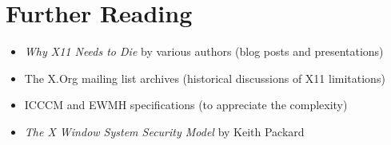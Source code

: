 \section{Further Reading}

\begin{itemize}
    \item \textit{Why X11 Needs to Die} by various authors (blog posts and presentations)
    \item The X.Org mailing list archives (historical discussions of X11 limitations)
    \item ICCCM and EWMH specifications (to appreciate the complexity)
    \item \textit{The X Window System Security Model} by Keith Packard
\end{itemize}

\clearpage
